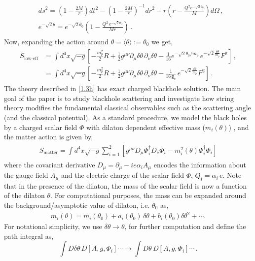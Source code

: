 \begin{align}
\begin{split}
   & ds^2=\left(1-\frac{2M}{r}\right)dt^2-\left(1-\frac{2M}{r}\right)^{-1}dr^2-r\left(r-\frac{Q^2e^{-\sqrt{2}\theta_0}}{M}\right)d\Omega\,,
  \\ & e^{-\sqrt{2}\theta}=e^{-\sqrt{2}\theta_0}\left(1-\frac{Q^2\, e^{-\sqrt{2}\theta_0}}{Mr}\right)\,.
  \end{split}
\end{align}
Now, expanding the action around $\theta=\langle \theta\rangle:=\theta_0$ we  get,
     \begin{align}
        \begin{split}
              S_{\textrm{low-eff}}&=\int d^4 x \sqrt{-g}\left[-\frac{m_p^2}{2}R+\frac{1}{2}g^{\mu\nu}\partial_{\mu}\delta\theta\,\partial_\nu \delta\theta-\frac{1}{16}e^{-\sqrt{2}\theta_0/m_p}\,e^{-\sqrt{2}\frac{\delta\theta}{m_p}}F^2\right]\,, \\ &
              =\int d^4 x \sqrt{-g}\left[-\frac{m_p^2}{2}R+\frac{1}{2}g^{\mu\nu}\partial_{\mu}\delta\theta\,\partial_\nu \delta\theta-\frac{1}{16 \,\texttt{g}_{c}}\,e^{-\sqrt{2}\frac{\delta\theta}{m_p}}F^2\right]\,. \label{1.3h}
        \end{split}
    \end{align}
The theory described in \eqref{1.3h} has exact charged blackhole solution. The main goal of the paper is to study blackhole scattering and investigate how string theory modifies the fundamental classical observables such as the scattering angle (and the classical potential). As a standard procedure, we model the black holes by a charged scalar field $\Phi$ with dilaton dependent effective mass ($m_i(\theta)$)  , and the matter action is given by,
\begin{align}
    \begin{split}
        S_{\textrm{matter}}=\int d^4x \sqrt{-g}\sum_{i=1}^2\left[g^{\mu\nu}D_{\mu}\Phi^{\dagger}_iD_{\nu}\Phi_i-m_i^2(\theta)\Phi^{\dagger}_i\Phi_i\right]
    \end{split}
\end{align}
where the covariant derivative $D_{\mu}=\partial_{\mu}-ie\alpha_iA_{\mu}$ encodes the information about the gauge field $A_{\mu}$ and the electric charge of the scalar field $\Phi$, \textcolor{black}{ $Q_i=\alpha_i\,e$}.
Note that in the presence of the dilaton, the mass of the scalar field is now a function of the dilaton $\theta$. For computational purposes, the mass can be expanded around the background/asymptotic value of dilaton, i.e. $\theta_0$ as,
\begin{align}
    m_i(\theta)=m_i(\theta_0)+a_i(\theta_0)\,\delta\theta+b_i (\theta_0)\delta\theta^2+\cdots.
\end{align}
For notational simplicity, we use $\delta\theta\to \theta$, for further computation and define the path integral as, $$\int D\delta\theta\, D[A,g,\Phi_i]\cdots\to \int D\theta \,D[A,g,\Phi_i]\cdots\,. $$
